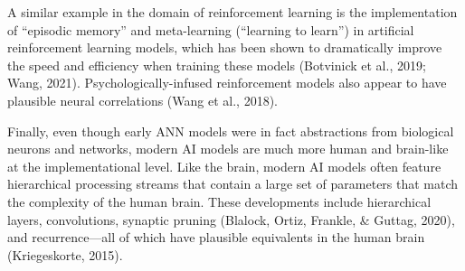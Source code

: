 A similar example in the domain of reinforcement learning is the
implementation of ``episodic memory'' and meta-learning
(``learning to learn'') in artificial reinforcement learning models,
which has been shown to dramatically improve the speed and efficiency
when training these models (Botvinick et al., 2019; Wang, 2021).
Psychologically-infused reinforcement models also appear to have
plausible neural correlations (Wang et al., 2018).

Finally, even though early ANN models were in fact abstractions from
biological neurons and networks, modern AI models are much more human
and brain-like at the implementational level.
Like the brain, modern AI models often feature hierarchical processing
streams that contain a large set of parameters that match the
complexity of the human brain.
These developments include hierarchical layers, convolutions,
synaptic pruning (Blalock, Ortiz, Frankle, \& Guttag, 2020), and
recurrence---all of which have plausible equivalents in the human
brain (Kriegeskorte, 2015).
